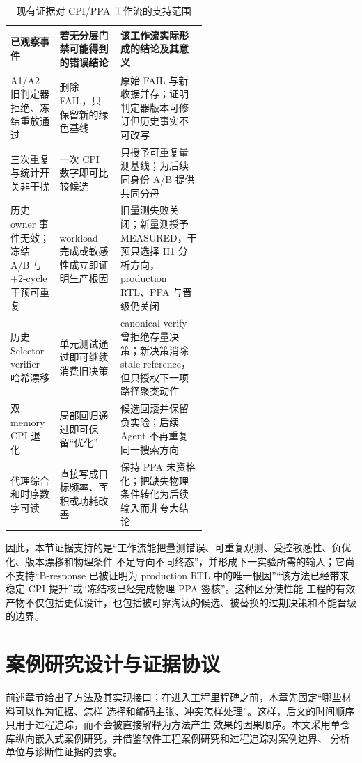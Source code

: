 \documentclass[UTF8,a4paper,zihao=-4,oneside]{ctexart}
\begin{document}
\begin{table}[H]
  \centering
  \small
  \setlength{\tabcolsep}{3pt}
  \renewcommand{\arraystretch}{0.94}
  \caption{现有证据对 CPI/PPA 工作流的支持范围}
  \label{tab:ppa-instruction-products}
  \begin{tabularx}{\linewidth}{@{}L{0.25\linewidth}L{0.31\linewidth}Y@{}}
    \toprule
    已观察事件 & 若无分层门禁可能得到的错误结论 & 该工作流实际形成的结论及其意义 \\
    \midrule
    A1/A2 旧判定器拒绝、冻结重放通过 & 删除 FAIL，只保留新的绿色基线 & 原始 FAIL 与新收据并存；证明判定器版本可修订但历史事实不可改写 \\
    三次重复与统计开关非干扰 & 一次 CPI 数字即可比较候选 & 只授予可重复量测基线；为后续同身份 A/B 提供共同分母 \\
    历史 owner 事件无效；冻结 A/B 与 $+2$-cycle 干预可重复 & workload 完成或敏感性成立即证明生产根因 & 旧量测失败关闭；新量测授予 MEASURED，干预只选择 H1 分析方向，production RTL、PPA 与晋级仍关闭 \\
    历史 Selector verifier 哈希漂移 & 单元测试通过即可继续消费旧决策 & canonical verify 曾拒绝存量决策；新决策消除 stale reference，但只授权下一项路径聚类动作 \\
    双 memory CPI 退化 & 局部回归通过即可保留“优化” & 候选回滚并保留负实验；后续 Agent 不再重复同一搜索方向 \\
    代理综合和时序数字可读 & 直接写成目标频率、面积或功耗改善 & 保持 PPA 未资格化；把缺失物理条件转化为后续输入而非夸大结论 \\
    \bottomrule
  \end{tabularx}
\end{table}

因此，本节证据支持的是“工作流能把量测错误、可重复观测、受控敏感性、负优化、版本漂移和物理条件
不足导向不同终态”，并形成下一实验所需的输入；它尚不支持“B-response 已被证明为 production RTL
中的唯一根因”“该方法已经带来稳定 CPI 提升”或“冻结核已经完成物理 PPA 签核”。这种区分使性能
工程的有效产物不仅包括更优设计，也包括被可靠淘汰的候选、被替换的过期决策和不能晋级的边界。

\section{案例研究设计与证据协议}
\label{sec:case-design}

前述章节给出了方法及其实现接口；在进入工程里程碑之前，本章先固定“哪些材料可以作为证据、怎样
选择和编码主张、冲突怎样处理”。这样，后文的时间顺序只用于过程追踪，而不会被直接解释为方法产生
效果的因果顺序。本文采用单仓库纵向嵌入式案例研究，并借鉴软件工程案例研究和过程追踪对案例边界、
分析单位与诊断性证据的要求\cite{runeson2009casestudy,beach2019processtracing}。
\end{document}

